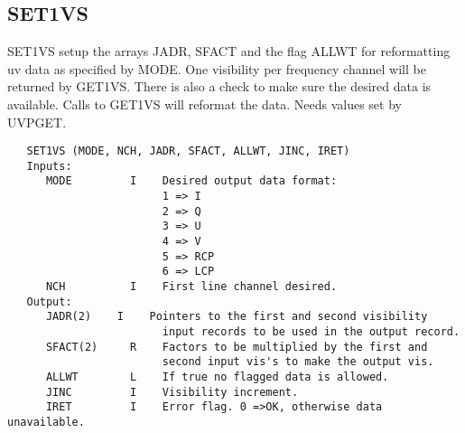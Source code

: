 \subsection{SET1VS}
SET1VS setup the arrays JADR, SFACT and the flag ALLWT for
reformatting uv data as specified by MODE.  One visibility per
frequency channel will be returned by GET1VS. There is also a check
to make sure the desired data is available.  Calls to GET1VS will
reformat the data.  Needs values set by UVPGET.
\begin{verbatim}
   SET1VS (MODE, NCH, JADR, SFACT, ALLWT, JINC, IRET)
   Inputs:
      MODE         I    Desired output data format:
                        1 => I
                        2 => Q
                        3 => U
                        4 => V
                        5 => RCP
                        6 => LCP
      NCH          I    First line channel desired.
   Output:
      JADR(2)    I    Pointers to the first and second visibility
                        input records to be used in the output record.
      SFACT(2)     R    Factors to be multiplied by the first and
                        second input vis's to make the output vis.
      ALLWT        L    If true no flagged data is allowed.
      JINC         I    Visibility increment.
      IRET         I    Error flag. 0 =>OK, otherwise data unavailable.
\end{verbatim}

